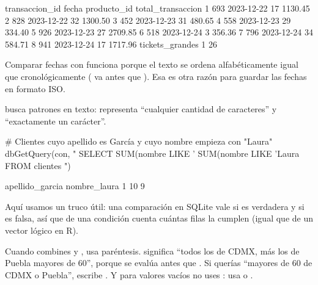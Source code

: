 \begin{rsalida}
  transaccion_id      fecha producto_id total_transaccion
1            693 2023-12-22          17           1130.45
2            828 2023-12-22          32           1300.50
3            452 2023-12-23          31            480.65
4            558 2023-12-23          29            334.40
5            926 2023-12-23          27           2709.85
6            518 2023-12-24           3            356.36
7            796 2023-12-24          34            584.71
8            941 2023-12-24          17           1717.96
  tickets_grandes
1              26
\end{rsalida}

Comparar fechas con  funciona porque el texto
 se ordena alfabéticamente igual que cronológicamente
( va antes que ). Esa es otra
razón para guardar las fechas en formato ISO.

 busca patrones en texto: \codigo{\%} representa ``cualquier
cantidad de caracteres'' y \codigo{\_} ``exactamente un carácter''.

\begin{rcode}
# Clientes cuyo apellido es García y cuyo nombre empieza con "Laura"
dbGetQuery(con, "
  SELECT
    SUM(nombre LIKE '%
    SUM(nombre LIKE 'Laura%
  FROM clientes
")
\end{rcode}

\begin{rsalida}
  apellido_garcia nombre_laura
1              10            9
\end{rsalida}

Aquí usamos un truco útil: una comparación en SQLite vale  si es
verdadera y  si es falsa, así que  de una condición
cuenta cuántas filas la cumplen (igual que  de un vector
lógico en R).

\begin{advertencia}
Cuando combines  y , usa paréntesis.
 significa
``todos los de CDMX, más los de Puebla mayores de 60'', porque
 se evalúa antes que . Si querías ``mayores de 60 de
CDMX o Puebla'', escribe
. Y para
valores vacíos no uses : usa  o
.
\end{advertencia}

